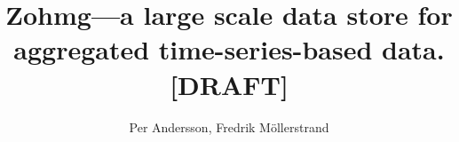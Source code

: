 \newcommand{\chapterquote}[2] {
\begin{quote}
\textit{"{#1}"}

--- {#2}
\end{quote}
\vspace{12pt}
}


\documentclass[a4paper,10pt]{report}
\usepackage{graphicx}
\usepackage{listings}

\author{Per Andersson, Fredrik M{\"o}llerstrand}
\title{Zohmg---a large scale data store for aggregated time-series-based
data. [DRAFT]}


\maketitle

\noindent {\Large \textbf{Abstract}}
\vspace{12pt}
\noindent


Making sense of data at a massive scale is one of the biggest challenges we face
at Last.fm. Interpreting patterns in user behaviour becomes a challenge when
millions of users interact in billions of combinations; the data sets must be
analyzed, summarized and presented visually in order to convey their meaning.

This thesis describes a data store for multi-dimensional time-series-based data.
Measurements are summarized across multiple dimensions. The data store is
optimized for speed of data retrieval: one of the design goals is to serve data
at mouse-click rate to promote real-time data exploration.

Similar data stores exist; they generally use relational database systems as
their backing database. The novelty of our approach is to model multidimensional
data cubes on top of a column-oriented database, reaping the scalability
benefits of such databases.


\tableofcontents
\vfill
\pagebreak

\chapter{Introduction}

\section{Background}


